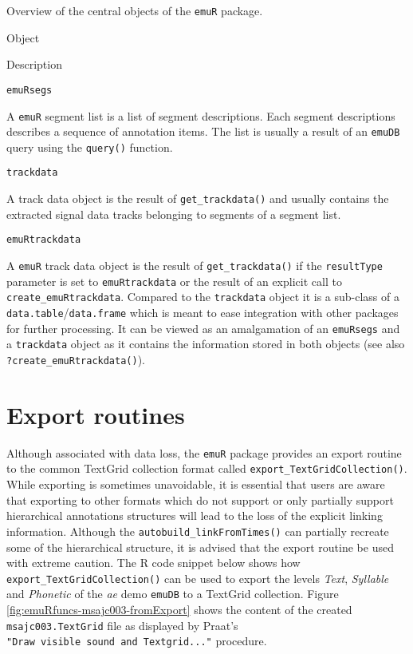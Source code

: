 \documentclass[
]{book}
\begin{document}
\label{tab:emuRpackageDetails-centralObjects}Overview of the central objects of the \texttt{emuR} package.

Object

Description

\texttt{emuRsegs}

A \texttt{emuR} segment list is a list of segment descriptions. Each segment descriptions describes a sequence of annotation items. The list is usually a result of an \texttt{emuDB} query using the \texttt{query()} function.

\texttt{trackdata}

A track data object is the result of \texttt{get\_trackdata()} and usually contains the extracted signal data tracks belonging to segments of a segment list.

\texttt{emuRtrackdata}

A \texttt{emuR} track data object is the result of \texttt{get\_trackdata()} if the \texttt{resultType} parameter is set to \texttt{emuRtrackdata} or the result of an explicit call to \texttt{create\_emuRtrackdata}. Compared to the \texttt{trackdata} object it is a sub-class of a \texttt{data.table}/\texttt{data.frame} which is meant to ease integration with other packages for further processing. It can be viewed as an amalgamation of an \texttt{emuRsegs} and a \texttt{trackdata} object as it contains the information stored in both objects (see also \texttt{?create\_emuRtrackdata()}).

\hypertarget{sec:emuRpackageDetails-exportRoutines}{%
\section{Export routines}\label{sec:emuRpackageDetails-exportRoutines}}

Although associated with data loss, the \texttt{emuR} package provides an export routine to the common TextGrid collection format called \texttt{export\_TextGridCollection()}. While exporting is sometimes unavoidable, it is essential that users are aware that exporting to other formats which do not support or only partially support hierarchical annotations structures will lead to the loss of the explicit linking information. Although the \texttt{autobuild\_linkFromTimes()} can partially recreate some of the hierarchical structure, it is advised that the export routine be used with extreme caution. The R code snippet below shows how \texttt{export\_TextGridCollection()} can be used to export the levels \emph{Text}, \emph{Syllable} and \emph{Phonetic} of the \emph{ae} demo \texttt{emuDB} to a TextGrid collection. Figure \ref{fig:emuRfuncs-msajc003-fromExport} shows the content of the created \texttt{msajc003.TextGrid} file as displayed by Praat's \texttt{"Draw\ visible\ sound\ and\ Textgrid..."} procedure.
\end{document}
